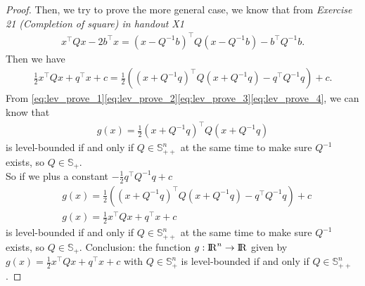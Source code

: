 \documentclass[a4paper,11pt,reqno]{amsart}
\newcommand{\R}{{\rm I\!R}}
\newcommand{\tran}{\intercal}
\newcommand{\smallplus}{{\scriptscriptstyle +}}
\newcommand{\Sp}{\mathbb{S}_{\smallplus}}
\begin{document}
\begin{proof}
Then, we try to prove the more general case, we know that from \emph{Exercise 21 (Completion of square) in handout X1}
\begin{align}
    x^{\tran}Qx-2b^{\tran}x=(x-Q^{-1}b)^{\tran}Q(x-Q^{-1}b)-b^{\tran}Q^{-1}b.
\end{align}
Then we have
\begin{align}
    \tfrac{1}{2}x^{\tran}Qx+q^{\tran}x+c=\tfrac{1}{2}\left( (x+Q^{-1}q)^{\tran}Q(x+Q^{-1}q)-q^{\tran}Q^{-1}q \right)+c .
\end{align}
From \eqref{eq:lev_prove_1}\eqref{eq:lev_prove_2}\eqref{eq:lev_prove_3}\eqref{eq:lev_prove_4}, we can know that
\begin{align}
    g(x)=\tfrac{1}{2} (x+Q^{-1}q)^{\tran}Q(x+Q^{-1}q)
\end{align}
is level-bounded if and only if $Q\in \mathbb{S}^n_{++}$ at the same time to make sure $Q^{-1}$ exists, so $Q\in \Sp$.
\\
So if we plus a constant $-\tfrac{1}{2}q^{\tran}Q^{-1}q +c$
\begin{align}
    &g(x)=\tfrac{1}{2}\left( (x+Q^{-1}q)^{\tran}Q(x+Q^{-1}q)-q^{\tran}Q^{-1}q \right)+c
    \\
    &g(x)=\tfrac{1}{2}x^{\tran}Qx+q^{\tran}x+c
\end{align}
is level-bounded if and only if $Q\in \mathbb{S}^n_{++}$ at the same time to make sure $Q^{-1}$ exists, so $Q\in \Sp$.
Conclusion: the function $g:\R^n\to \R$ given by $g(x) = \frac{1}{2}x^{\tran}Qx+q^{\tran}x+c$ with $Q\in \mathbb{S}^n_+$ is level-bounded
if and only if $Q\in \mathbb{S}^n_{++}$.
\end{proof}
\end{document}
